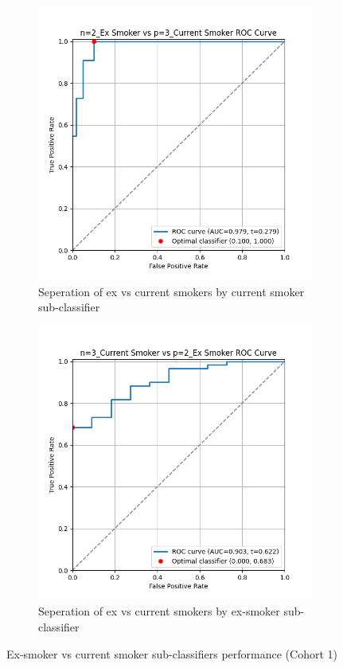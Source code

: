 \documentclass{article}
\begin{document}
\begin{figure}
    \begin{subfigure}{0.48\textwidth}
        \centering
        \includegraphics[width=\linewidth]{cohort1_2v3_roc.png}
        \caption{Seperation of ex vs current smokers by current smoker sub-classifier}
    \end{subfigure}
    \hfill
    \begin{subfigure}{0.48\textwidth}
        \centering
        \includegraphics[width=\linewidth]{cohort1_3v2_roc.png}
        \caption{Seperation of ex vs current smokers by ex-smoker sub-classifier}
    \end{subfigure}
    \caption{Ex-smoker vs current smoker sub-classifiers performance (Cohort 1)}
\end{figure}
\end{document}
